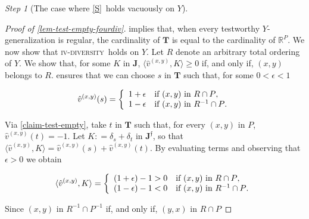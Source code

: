 \documentclass[ecta,nameyear,draft]{econsocart}
\newcommand{\R}{\mathbb R}
\newcommand{\novel}{\mathfrak f}
\newcommand{\mbbt}{{\mathbf {T}}}
\newcommand{\mbbj}{\mathbf J}
\newcommand{\mbbjp}{{\mathbf {J}^{\novel}}}
\newcommand{\xy}{{(x, y)}}
\newcommand{\yx}{{(y, x)}}
\newcommand{\stability}{\ref{S}}
\newcommand{\fourdiv}{\textsc{iv}-\textsc{diversity}}
\theoremstyle{plain}
\theoremstyle{remark}
\newtheorem{step}{Step}[section]
\begin{document}
\begin{appendix}
\begin{step}[The case where \stability\ holds vacuously on $Y$]
\begin{proof}[Proof of \cref{lem-test-empty-fourdiv}]
       implies that, when every testworthy
      $Y$-generalization is regular, the cardinality of $\mbbt$ is equal to the
      cardinality of $\R^{P}$.  We now show that \fourdiv\ holds on $Y$. Let
      ${R}$ denote an arbitrary total ordering of $Y$.  We show that, for some
      $K$ in $\mbbj$, $\langle \hat{v}^{\xy}, K \rangle \geq 0$ if, and only if,
      $\xy$ belongs to ${R}$.  ensures that we can choose
      $s$ in $\mbbt$ such that, for some $0 < \epsilon <1$
      \begin{linenomath*}
        \begin{equation*}
          \hat{v}^{\xy} ( s ) = \left \{
            \begin{array}{l l}
              1+ \epsilon & \text{if $\xy$ in ${R} \cap P $},\\
              1-\epsilon & \text{if $\xy$ in ${R}^{- 1} \cap P $}.
            \end{array}
          \right.
        \end{equation*}
      \end{linenomath*}
      Via \cref{claim-test-empty}, take $t$ in $\mbbt$ such that, for every $\xy$
      in $P$, $\hat{v}^{\xy} ( t ) = -1$.  Let $K : = \delta _{s} + \delta _{t }$
      in $\mbbjp$, so that $\langle \hat{v}^{\xy}, K \rangle = \hat{v}^{\xy}(s) +
      \hat{v}^{\xy}(t)$. By evaluating terms and observing that $\epsilon > 0$ we
      obtain
      \begin{linenomath*} 
        \begin{equation*}
          \langle \hat{v}^{\xy}, K \rangle = \left \{
            \begin{array}{l l}
              (1+ \epsilon) - 1 > 0 & \text{if $\xy$ in ${R} \cap P $},\\
              (1- \epsilon) - 1 < 0 & \text{if $\xy$ in ${R}^{-1}\cap P$}.
            \end{array}
          \right.
        \end{equation*}
      \end{linenomath*} 
      Since $\xy$ in ${R}^{-1} \cap P^{-1}$ if, and only if, $\yx$ in ${R}\cap P$

\end{proof}
\end{step}
\end{appendix}
\end{document}
